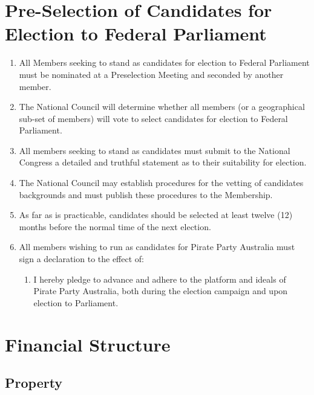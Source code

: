 \documentclass[a4paper,titlepage,8.5pt]{article}
\begin{document}
\section{Pre-Selection of Candidates for Election to Federal Parliament}

\begin{enumerate}
\item All Members seeking to stand as candidates for election to Federal Parliament must be nominated at a Preselection Meeting and seconded by another member.
\item The National Council will determine whether all members (or a geographical sub-set of members) will vote to select candidates for election to Federal Parliament.
\item All members seeking to stand as candidates must submit to the National Congress a detailed and truthful statement as to their suitability for election.
\item The National Council may establish procedures for the vetting of candidates backgrounds and must publish these procedures to the Membership.
\item As far as is practicable, candidates should be selected at least twelve (12) months before the normal time of the next election.
\item All members wishing to run as candidates for Pirate Party Australia must sign a declaration to the effect of:
\begin{enumerate}
	\item I hereby pledge to advance and adhere to the platform and ideals of Pirate Party Australia, both during the election campaign and upon election to Parliament.
\end{enumerate}
\end{enumerate}

\section{Financial Structure}

\subsection{Property}
\end{document}
